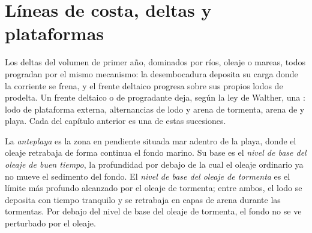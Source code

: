 \begin{omfigure}
\par{}\label{fig:b3:facies-models:rivers}
\end{omfigure}

\section{Líneas de costa, deltas y plataformas}\label{sec:b3:facies-models:shelves}

Los deltas del volumen de primer año, dominados por ríos, oleaje o mareas, todos
progradan por el mismo mecanismo: la desembocadura deposita su carga donde la
corriente se frena, y el frente deltaico progresa sobre sus propios lodos de prodelta. Un
frente deltaico o de  progradante deja, según la ley de Walther, una
: lodo de plataforma externa, alternancias de lodo y arena de tormenta,
arena de  y playa. Cada  del capítulo anterior es una de estas
sucesiones.

\begin{definition}\label{def:b3:facies-models:shoreface}
La \emph{anteplaya} es la zona en pendiente situada mar adentro de la
playa, donde el oleaje retrabaja de forma continua el fondo marino. Su base es el
\emph{nivel de base del oleaje de buen tiempo}, la profundidad
por debajo de la cual el oleaje ordinario ya no mueve el sedimento del fondo. El \emph{nivel de base del
oleaje de tormenta} es el límite más profundo alcanzado por el oleaje de tormenta;
entre ambos, el lodo se deposita con tiempo tranquilo y se retrabaja en capas de arena
durante las tormentas. Por debajo del nivel de base del oleaje de tormenta, el fondo no se ve perturbado por el oleaje.
\end{definition}

